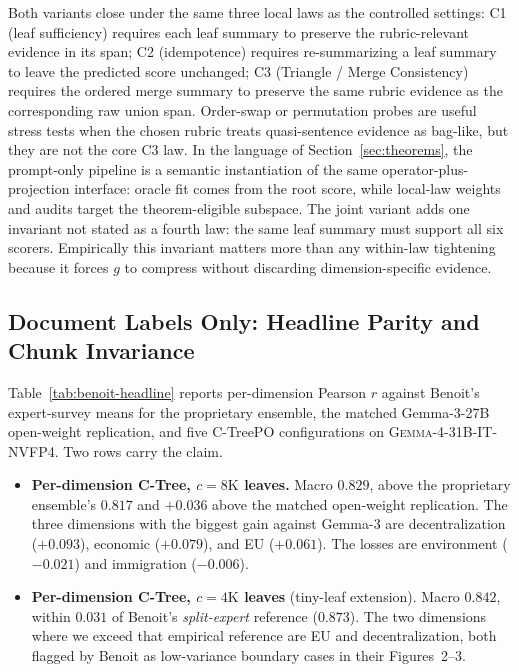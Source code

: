 Both variants close under the same three local laws as the controlled
settings: C1 (leaf sufficiency) requires each leaf summary to
preserve the rubric-relevant evidence in its span; C2 (idempotence)
requires re-summarizing a leaf summary to leave the predicted score
unchanged; C3 (Triangle / Merge Consistency) requires the ordered merge
summary to preserve the same rubric evidence as the corresponding raw
union span.
Order-swap or permutation probes are useful stress tests when the chosen
rubric treats quasi-sentence evidence as bag-like, but they are not the
core C3 law. In the language of Section~\ref{sec:theorems}, the prompt-only
pipeline is a semantic instantiation of the same operator-plus-projection
interface: oracle fit comes from the root score, while local-law weights
and audits target the theorem-eligible subspace. The joint variant adds
one invariant not stated as a fourth law: the same leaf summary must
support all six scorers. Empirically this invariant matters more than any
within-law tightening because it forces $g$ to compress without discarding
dimension-specific evidence.

\subsection{Document Labels Only: Headline Parity and Chunk Invariance}\label{sec:benoit-headline}

Table~\ref{tab:benoit-headline} reports per-dimension Pearson $r$
against Benoit's expert-survey means for the proprietary ensemble, the
matched Gemma-3-27B open-weight replication, and five C-TreePO
configurations on \textsc{Gemma-4-31B-IT-NVFP4}. Two rows carry the
claim.

\begin{itemize}[leftmargin=1.5em]
    \item \textbf{Per-dimension C-Tree, $c = 8\mathrm{K}$ leaves.}
          Macro $0.829$, above the proprietary ensemble's $0.817$ and
          $+0.036$ above the matched open-weight replication. The
          three dimensions with the biggest gain against Gemma-3
          are decentralization ($+0.093$), economic ($+0.079$), and
          EU ($+0.061$). The losses are environment ($-0.021$) and
          immigration ($-0.006$).
    \item \textbf{Per-dimension C-Tree, $c = 4\mathrm{K}$ leaves}
          (tiny-leaf extension). Macro $0.842$, within $0.031$ of
          Benoit's \emph{split-expert} reference ($0.873$). The
          two dimensions where we exceed that empirical reference are
          EU and decentralization, both flagged by Benoit as
          low-variance boundary cases in their Figures~2--3.
\end{itemize}

